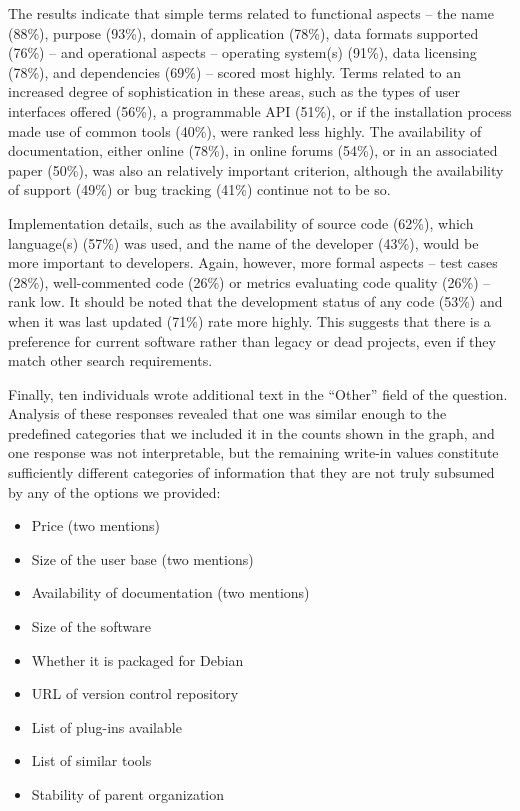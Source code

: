 \documentclass{casicswhitepaper}
\begin{document}
The results indicate that simple terms related to functional aspects -- the name (88\%), purpose (93\%), domain of application (78\%), data formats supported (76\%) -- and operational aspects -- operating system(s) (91\%), data licensing (78\%), and dependencies (69\%) -- scored most highly. Terms related to an increased degree of sophistication in these areas, such as the types of user interfaces offered (56\%), a programmable API (51\%), or if the installation process made use of common tools (40\%), were ranked less highly.  The availability of documentation, either online (78\%), in online forums (54\%), or in an associated paper (50\%), was also an relatively important criterion, although the availability of support (49\%) or bug tracking (41\%) continue not to be so.

Implementation details, such as the availability of source code (62\%), which language(s) (57\%) was used, and the name of the developer (43\%), would be more important to developers. Again, however, more formal aspects -- test cases (28\%), well-commented code (26\%) or metrics evaluating code quality (26\%) -- rank low. It should be noted that the development status of any code (53\%) and when it was last updated (71\%) rate more highly. This suggests that there is a preference for current software rather than legacy or dead projects, even if they match other search requirements.

Finally, ten individuals wrote additional text in the ``Other'' field of the question.  Analysis of these responses revealed that one was similar enough to the predefined categories that we included it in the counts shown in the graph, and one response was not interpretable, but the remaining write-in values constitute sufficiently different categories of information that they are not truly subsumed by any of the options we provided:

\begin{itemize}[itemsep=0ex]

\item Price (two mentions)
\item Size of the user base (two mentions)
\item Availability of documentation (two mentions)
\item Size of the software
\item Whether it is packaged for Debian
\item URL of version control repository
\item List of plug-ins available
\item List of similar tools
\item Stability of parent organization

\end{itemize}
\end{document}
